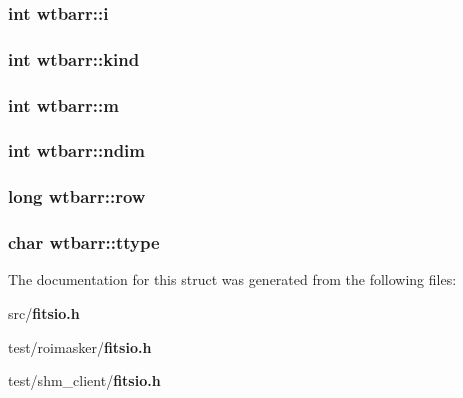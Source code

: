 \subsubsection{\setlength{\rightskip}{0pt plus 5cm}int \bf{wtbarr::i}}\label{structwtbarr_8743b84c99b4b5e7ab7bf0653507a180}


\subsubsection{\setlength{\rightskip}{0pt plus 5cm}int \bf{wtbarr::kind}}\label{structwtbarr_f8ea7b15992ab7a86be63ff83318be41}


\subsubsection{\setlength{\rightskip}{0pt plus 5cm}int \bf{wtbarr::m}}\label{structwtbarr_1e88ad32570534a006e96cba721489b5}


\subsubsection{\setlength{\rightskip}{0pt plus 5cm}int \bf{wtbarr::ndim}}\label{structwtbarr_f862b4f90b0406ed8dd0c240768d4bd3}


\subsubsection{\setlength{\rightskip}{0pt plus 5cm}long \bf{wtbarr::row}}\label{structwtbarr_2ff7c235353320c6dd98951484012ee7}


\subsubsection{\setlength{\rightskip}{0pt plus 5cm}char \bf{wtbarr::ttype}}\label{structwtbarr_750832793167bbeebd1074e29844415d}




The documentation for this struct was generated from the following files:\begin{CompactItemize}
\item 
src/\bf{fitsio.h}\item 
test/roimasker/\bf{fitsio.h}\item 
test/shm\_\-client/\bf{fitsio.h}\end{CompactItemize}
